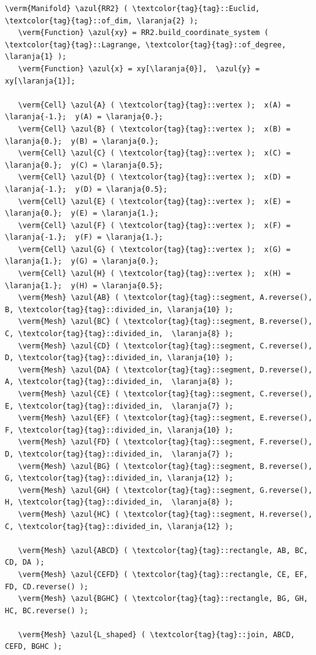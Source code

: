 \begin{Verbatim}[commandchars=\\\{\},formatcom=\small\tt,frame=single,
   label=parag-\ref{\numb section 1.\numb parag 3}.cpp,rulecolor=\color{coment},
   baselinestretch=0.94,framesep=2mm]
   \verm{Manifold} \azul{RR2} ( \textcolor{tag}{tag}::Euclid, \textcolor{tag}{tag}::of_dim, \laranja{2} );
   \verm{Function} \azul{xy} = RR2.build_coordinate_system ( \textcolor{tag}{tag}::Lagrange, \textcolor{tag}{tag}::of_degree, \laranja{1} );
   \verm{Function} \azul{x} = xy[\laranja{0}],  \azul{y} = xy[\laranja{1}];

   \verm{Cell} \azul{A} ( \textcolor{tag}{tag}::vertex );  x(A) = \laranja{-1.};  y(A) = \laranja{0.};
   \verm{Cell} \azul{B} ( \textcolor{tag}{tag}::vertex );  x(B) =  \laranja{0.};  y(B) = \laranja{0.};
   \verm{Cell} \azul{C} ( \textcolor{tag}{tag}::vertex );  x(C) =  \laranja{0.};  y(C) = \laranja{0.5};
   \verm{Cell} \azul{D} ( \textcolor{tag}{tag}::vertex );  x(D) = \laranja{-1.};  y(D) = \laranja{0.5};
   \verm{Cell} \azul{E} ( \textcolor{tag}{tag}::vertex );  x(E) =  \laranja{0.};  y(E) = \laranja{1.};
   \verm{Cell} \azul{F} ( \textcolor{tag}{tag}::vertex );  x(F) = \laranja{-1.};  y(F) = \laranja{1.};
   \verm{Cell} \azul{G} ( \textcolor{tag}{tag}::vertex );  x(G) =  \laranja{1.};  y(G) = \laranja{0.};
   \verm{Cell} \azul{H} ( \textcolor{tag}{tag}::vertex );  x(H) =  \laranja{1.};  y(H) = \laranja{0.5};
   \verm{Mesh} \azul{AB} ( \textcolor{tag}{tag}::segment, A.reverse(), B, \textcolor{tag}{tag}::divided_in, \laranja{10} );
   \verm{Mesh} \azul{BC} ( \textcolor{tag}{tag}::segment, B.reverse(), C, \textcolor{tag}{tag}::divided_in,  \laranja{8} );
   \verm{Mesh} \azul{CD} ( \textcolor{tag}{tag}::segment, C.reverse(), D, \textcolor{tag}{tag}::divided_in, \laranja{10} );
   \verm{Mesh} \azul{DA} ( \textcolor{tag}{tag}::segment, D.reverse(), A, \textcolor{tag}{tag}::divided_in,  \laranja{8} );
   \verm{Mesh} \azul{CE} ( \textcolor{tag}{tag}::segment, C.reverse(), E, \textcolor{tag}{tag}::divided_in,  \laranja{7} );
   \verm{Mesh} \azul{EF} ( \textcolor{tag}{tag}::segment, E.reverse(), F, \textcolor{tag}{tag}::divided_in, \laranja{10} );
   \verm{Mesh} \azul{FD} ( \textcolor{tag}{tag}::segment, F.reverse(), D, \textcolor{tag}{tag}::divided_in,  \laranja{7} );
   \verm{Mesh} \azul{BG} ( \textcolor{tag}{tag}::segment, B.reverse(), G, \textcolor{tag}{tag}::divided_in, \laranja{12} );
   \verm{Mesh} \azul{GH} ( \textcolor{tag}{tag}::segment, G.reverse(), H, \textcolor{tag}{tag}::divided_in,  \laranja{8} );
   \verm{Mesh} \azul{HC} ( \textcolor{tag}{tag}::segment, H.reverse(), C, \textcolor{tag}{tag}::divided_in, \laranja{12} );

   \verm{Mesh} \azul{ABCD} ( \textcolor{tag}{tag}::rectangle, AB, BC, CD, DA );
   \verm{Mesh} \azul{CEFD} ( \textcolor{tag}{tag}::rectangle, CE, EF, FD, CD.reverse() );
   \verm{Mesh} \azul{BGHC} ( \textcolor{tag}{tag}::rectangle, BG, GH, HC, BC.reverse() );

   \verm{Mesh} \azul{L_shaped} ( \textcolor{tag}{tag}::join, ABCD, CEFD, BGHC );
\end{Verbatim}

